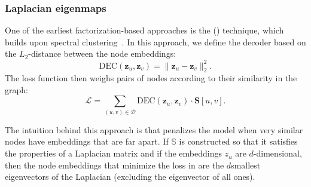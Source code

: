 \subsubsection{Laplacian eigenmaps}
One of the earliest factorization-based approaches is the  () technique, which builds upon spectral clustering~\cite{Belkin2001laplacianEigenmapsSpectralClusteringTechniquesEmbeddingClustering}. In this approach, we define the decoder based on the $L_2$-distance between the node embeddings:
\begin{equation*}
    \text{DEC}(\mathbf{z}_u, \mathbf{z}_v) = \|\mathbf{z}_u - \mathbf{z}_v\|_2^2.
\end{equation*}
The loss function then weighs pairs of nodes according to their similarity in the graph:
\begin{equation}\label{eq:laplacianEigenmaploss}
    \mathcal{L} = \sum_{(u,v)\in\mathcal{D}} \text{DEC}(\mathbf{z}_u, \mathbf{z}_v) \cdot \textbf{S}[u,v].
\end{equation}

The intuition behind this approach is that  penalizes the model when very similar nodes have embeddings that are far apart. If $\mathbb{S}$ is constructed so that it satisfies the properties of a Laplacian matrix and if the embeddings $z_u$ are $d$-dimensional, then the node embeddings that minimize the loss in  are the $d $smallest eigenvectors of the Laplacian (excluding the eigenvector of all ones).

